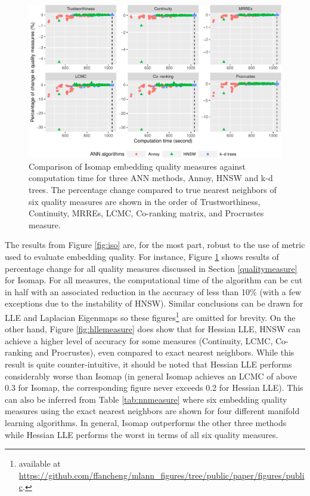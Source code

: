 \documentclass[11pt,a4paper,]{article}
\begin{document}
\begin{figure}

{\centering \includegraphics[width=1\linewidth]{mlann_ebs_files/figure-latex/iso6measure-1} 

}

\caption{Comparison of Isomap embedding quality measures against computation time for three ANN methods, Annoy, HNSW and k-d trees. The percentage change compared to true nearest neighbors of six quality measures are shown in the order of Trustworthiness, Continuity, MRREs, LCMC, Co-ranking matrix, and Procrustes measure. }\label{fig:iso6measure}
\end{figure}

The results from Figure \ref{fig:iso} are, for the most part, robust to the use of metric used to evaluate embedding quality. For instance, Figure \ref{fig:iso6measure} shows results of percentage change for all quality measures discussed in Section \ref{qualitymeasure} for Isomap. For all measures, the computational time of the algorithm can be cut in half with an associated reduction in the accuracy of less than 10\% (with a few exceptions due to the instability of HNSW). Similar conclusions can be drawn for LLE and Laplacian Eigenmaps so these figures\footnote{available at \url{https://github.com/ffancheng/mlann_figures/tree/public/paper/figures/public}.} are omitted for brevity.
On the other hand, Figure \ref{fig:hllemeasure} does show that for Hessian LLE, HNSW can achieve a higher level of accuracy for some measures (Continuity, LCMC, Co-ranking and Procrustes), even compared to exact nearest neighbors. While this result is quite counter-intuitive, it should be noted that Hessian LLE performs considerably worse than Isomap (in general Isomap achieves an LCMC of above 0.3 for Isomap, the corresponding figure never exceeds 0.2 for Hessian LLE).
This can also be inferred from Table \ref{tab:nnmeasure} where six embedding quality measures using the exact nearest neighbors are shown for four different manifold learning algorithms. In general, Isomap outperforms the other three methods while Hessian LLE performs the worst in terms of all six quality measures.
\end{document}
